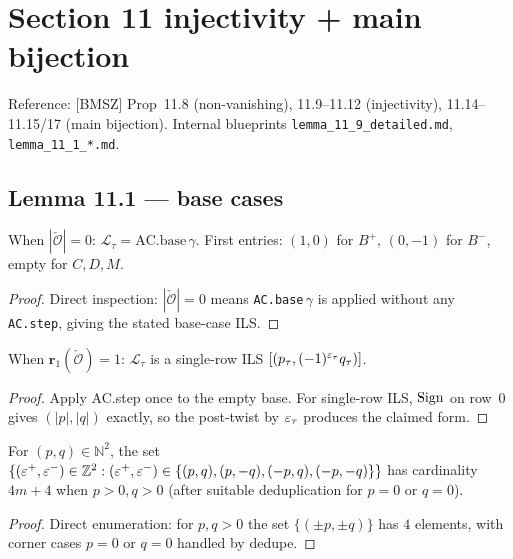 \chapter{Section 11 injectivity + main bijection}
\label{chap:11_main}

Reference: [BMSZ] Prop~11.8 (non-vanishing), 11.9--11.12 (injectivity),
11.14--11.15/17 (main bijection). Internal blueprints
\texttt{lemma\_11\_9\_detailed.md}, \texttt{lemma\_11\_1\_*.md}.

\section{Lemma 11.1 — base cases}

\begin{lemma}[Lemma 11.1(a): $|\check{\mathcal{O}}| = 0$]
  \label{lem:11_1_a_empty}
  \leanok
  When $|\check{\mathcal{O}}| = 0$: $\mathcal{L}_\tau = \mathrm{AC.base}\,\gamma$.
  First entries: $(1, 0)$ for $B^+$, $(0, -1)$ for $B^-$, empty for $C, D, M$.
\end{lemma}
\begin{proof}
  \leanok
  Direct inspection: $|\check{\mathcal{O}}| = 0$ means \texttt{AC.base}$\,\gamma$ is applied without any \texttt{AC.step}, giving the stated base-case ILS.
\end{proof}


\begin{lemma}[Lemma 11.1(a): $\mathbf{r}_1(\check{\mathcal{O}}) = 1$]
  \label{lem:11_1_a_r1}
  \leanok
  When $\mathbf{r}_1(\check{\mathcal{O}}) = 1$: $\mathcal{L}_\tau$ is a single-row ILS
  $[(p_\tau, (-1)^{\varepsilon_\tau} q_\tau)]$.
\end{lemma}

\begin{proof}
  \leanok
  Apply AC.step once to the empty base. For single-row ILS, $\mathrm{Sign}$ on row~0 gives $(|p|, |q|)$ exactly, so the post-twist by $\varepsilon_\tau$ produces the claimed form.
\end{proof}

\begin{theorem}
  \label{thm:SignTargetSet_card}
  \leanok
  For $(p, q) \in \mathbb{N}^2$, the set $\{(\varepsilon^+, \varepsilon^-) \in \mathbb{Z}^2 : (\varepsilon^+, \varepsilon^-) \in \{(p, q), (p, -q), (-p, q), (-p, -q)\}\}$ has cardinality
  $4m + 4$ when $p > 0, q > 0$ (after suitable deduplication for $p = 0$ or $q = 0$).
\end{theorem}
\begin{proof}
  \leanok
  Direct enumeration: for $p, q > 0$ the set $\{(\pm p, \pm q)\}$ has $4$ elements, with corner cases $p = 0$ or $q = 0$ handled by dedupe.
\end{proof}


